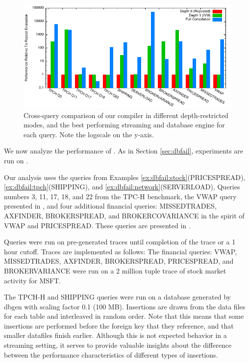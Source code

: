
\begin{figure}
\begin{center}
\includegraphics[width=\textwidth]{../graphs/graphs/bakeoff.pdf}
\caption{Cross-query comparison of our compiler in different depth-restricted modes, and the best performing streaming and database engine for each query.  Note the logscale on the y-axis.}
\label{fig:experiments:bakeoff}
\end{center}
\end{figure}

We now analyze the performance of \dbtoaster.  As in Section \ref{sec:dbfail}, experiments are run on . 
 
Our analysis uses the queries from Examples \ref{ex:dbfail:stock}(PRICESPREAD),  \ref{ex:dbfail:tpch}(SHIPPING), and \ref{ex:dbfail:network}(SERVERLOAD), Queries numbers 3, 11, 17, 18, and 22 from the TPC-H\cite{tpch} benchmark, the VWAP query presented in \cite{kennedy-ahmad-koch-cidr:11}, and four additional financial queries: MISSEDTRADES, AXFINDER, BROKERSPREAD, and BROKERCOVARIANCE in the spirit of VWAP and PRICESPREAD.  These queries are presented in .

Queries were run on pre-generated traces until completion of the trace or a 1 hour cutoff.  Traces are implemented as follows: The financial queries: VWAP, MISSEDTRADES, AXFINDER, BROKERSPREAD, PRICESPREAD, and BROKERVARIANCE were run on a 2 million tuple trace of stock market activity for MSFT.  

The TPCH-H and SHIPPING queries were run on a database generated by dbgen\cite{tpch} with scaling factor 0.1 (100 MB).  Insertions are drawn from the data files for each table and interleaved in random order.  Note that this means that some insertions are performed before the foreign key that they reference, and that smaller datafiles finish earlier.  Although this is not expected behavior in a streaming setting, it serves to provide valuable insights about the difference between the performance characteristics of different types of insertions.

